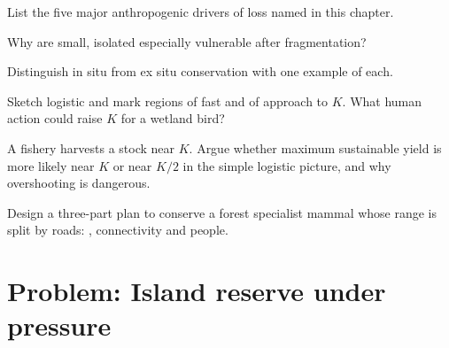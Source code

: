\begin{exercise}[$\star\star$]\label{exo:g12:populations-conservation:7}
List the five major anthropogenic drivers of  loss named in
this chapter.
\end{exercise}

\begin{exercise}[$\star\star$]\label{exo:g12:populations-conservation:8}
Why are small, isolated  especially vulnerable after
fragmentation?
\end{exercise}

\begin{exercise}[$\star\star$]\label{exo:g12:populations-conservation:9}
Distinguish in situ from ex situ conservation with one example of each.
\end{exercise}

\begin{exercise}[$\star\star\star$]\label{exo:g12:populations-conservation:10}
Sketch logistic  and mark regions of fast  and of approach
to $K$. What human action could raise $K$ for a wetland bird?
\end{exercise}

\begin{exercise}[$\star\star\star$]\label{exo:g12:populations-conservation:11}
A fishery harvests a stock near $K$. Argue whether maximum sustainable
yield is more likely near $K$ or near $K/2$ in the simple logistic
picture, and why overshooting is dangerous.
\end{exercise}

\begin{exercise}[$\star\star\star$]\label{exo:g12:populations-conservation:12}
Design a three-part plan to conserve a forest specialist mammal whose
range is split by roads: , connectivity and people.
\end{exercise}

\section{Problem: Island reserve under pressure}


